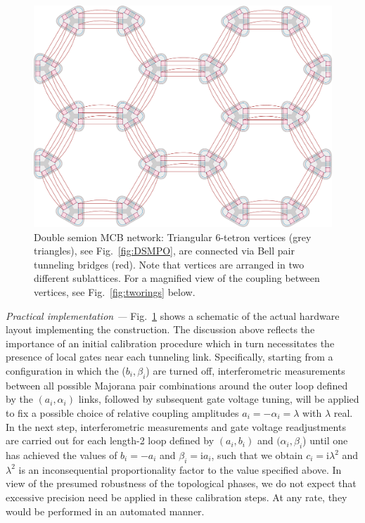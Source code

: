 \documentclass[twocolumn,floats,prx,showpacs]{revtex4-1}
\begin{document}
\begin{figure}
\includegraphics[width=\columnwidth]{fig/tiling.pdf}
\caption{Double semion MCB network: Triangular 6-tetron vertices (grey triangles), see Fig.~\ref{fig:DSMPO}, are connected via Bell pair tunneling bridges (red). Note that vertices are arranged in two different sublattices. For a magnified view of the coupling between vertices, see Fig.~\ref{fig:tworings} below.}
\label{fig:DS}
\end{figure}



\emph{Practical implementation ---} Fig.~\ref{fig:DS} shows a schematic of the actual hardware layout implementing the construction. The discussion above reflects the importance of an initial calibration procedure which in turn  necessitates the presence of  local gates near each tunneling link. Specifically,  starting from a configuration in which the ($b_i,\beta_i$) are  turned off, interferometric measurements \cite{Plugge2017,Karzig2017}  between all possible Majorana pair combinations around the outer loop defined by the $(a_i,\alpha_i)$ links, followed by subsequent gate voltage tuning, will be applied to fix a possible choice of relative coupling amplitudes  $a_i=-\alpha_i=\lambda$ with $\lambda$ real. In the next step, interferometric measurements and gate voltage readjustments  are carried out for each length-2 loop defined by $(a_i,b_i)$ and $(\alpha_i,\beta_i$) until one has achieved the values of $b_i=-a_i$ and $\beta_i=\mathrm i a_i$, such that we obtain $c_i =\mathrm i \lambda^2$ and $\lambda^2$ is an inconsequential proportionality factor to the value specified above.  In view of the presumed robustness of the topological phases, we do not expect that excessive precision need be applied in these calibration steps. At any rate, they would be performed in an automated manner.
\end{document}
